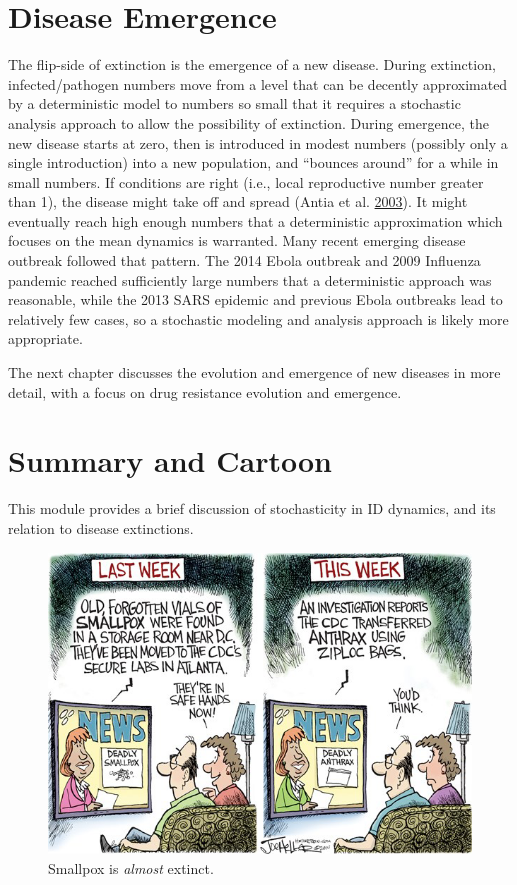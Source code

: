\documentclass[]{book}
\theoremstyle{definition}
\theoremstyle{definition}
\theoremstyle{definition}
\theoremstyle{remark}
\begin{document}
\section{Disease Emergence}\label{disease-emergence}

The flip-side of extinction is the emergence of a new disease. During
extinction, infected/pathogen numbers move from a level that can be
decently approximated by a deterministic model to numbers so small that
it requires a stochastic analysis approach to allow the possibility of
extinction. During emergence, the new disease starts at zero, then is
introduced in modest numbers (possibly only a single introduction) into
a new population, and ``bounces around'' for a while in small numbers.
If conditions are right (i.e., local reproductive number greater than
1), the disease might take off and spread (Antia et al.
\protect\hyperlink{ref-antia03}{2003}). It might eventually reach high
enough numbers that a deterministic approximation which focuses on the
mean dynamics is warranted. Many recent emerging disease outbreak
followed that pattern. The 2014 Ebola outbreak and 2009 Influenza
pandemic reached sufficiently large numbers that a deterministic
approach was reasonable, while the 2013 SARS epidemic and previous Ebola
outbreaks lead to relatively few cases, so a stochastic modeling and
analysis approach is likely more appropriate.

The next chapter discusses the evolution and emergence of new diseases
in more detail, with a focus on drug resistance evolution and emergence.

\section{Summary and Cartoon}\label{summary-and-cartoon-11}

This module provides a brief discussion of stochasticity in ID dynamics,
and its relation to disease extinctions.

\begin{figure}
\centering
\includegraphics{./images/smallpox.png}
\caption{\label{fig:smallpox}Smallpox is \emph{almost} extinct.}
\end{figure}
\end{document}
